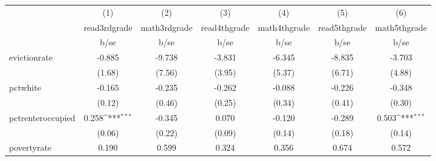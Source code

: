 {
\def\sym#1{\ifmmode^{#1}\else\(^{#1}\)\fi}
\begin{tabular}{l*{6}{c}}
\hline\hline
            &\multicolumn{1}{c}{(1)}           &\multicolumn{1}{c}{(2)}           &\multicolumn{1}{c}{(3)}           &\multicolumn{1}{c}{(4)}           &\multicolumn{1}{c}{(5)}           &\multicolumn{1}{c}{(6)}           \\
            &\multicolumn{1}{c}{read3rdgrade}  &\multicolumn{1}{c}{math3rdgrade}  &\multicolumn{1}{c}{read4thgrade}  &\multicolumn{1}{c}{math4thgrade}  &\multicolumn{1}{c}{read5thgrade}  &\multicolumn{1}{c}{math5thgrade}  \\
            &                     b/se         &                     b/se         &                     b/se         &                     b/se         &                     b/se         &                     b/se         \\
\hline
evictionrate&                   -0.885         &                   -9.738         &                   -3.831         &                   -6.345         &                   -8.835         &                   -3.703         \\
            &                   (1.68)         &                   (7.56)         &                   (3.95)         &                   (5.37)         &                   (6.71)         &                   (4.88)         \\
pctwhite    &                   -0.165         &                   -0.235         &                   -0.262         &                   -0.088         &                   -0.226         &                   -0.348         \\
            &                   (0.12)         &                   (0.46)         &                   (0.25)         &                   (0.34)         &                   (0.41)         &                   (0.30)         \\
pctrenteroccupied&                    0.258\sym{***}&                   -0.345         &                    0.070         &                   -0.120         &                   -0.289         &                    0.503\sym{***}\\
            &                   (0.06)         &                   (0.22)         &                   (0.09)         &                   (0.14)         &                   (0.18)         &                   (0.14)         \\
povertyrate &                    0.190         &                    0.599         &                    0.324         &                    0.356         &                    0.674         &                    0.572         \\

\end{tabular}}
